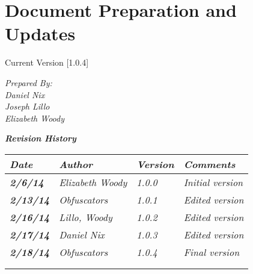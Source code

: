 
\chapter{Document Preparation and Updates}

Current Version [1.0.4]
\vspace*{5mm}

{\color{MSBlue3}
\noindent
\textit{Prepared By:}\\
\textit{Daniel Nix}\\
\textit{Joseph Lillo}\\
\textit{Elizabeth Woody}
}

\vfill
\noindent
{\color{color02} \textit{\textbf{Revision History}}}\\
\begin{tabular}{|>{\raggedright}p{1.5cm}|>{\raggedright}p{3cm}|>{\raggedright}p{1.5cm}|>{\raggedright}p{9cm}|}
\hline
\textit{\textbf{Date}} &  \textit{\textbf{Author}} & \textit{\textbf{Version}} & \textit{\textbf{Comments}}\tabularnewline
\hline
 \textit{\textbf{2/6/14}} & \textit{Elizabeth Woody} & \textit{1.0.0} & \textit{Initial version}\tabularnewline
\hline
\textit{\textbf{2/13/14}} & \textit{Obfuscators} & \textit{1.0.1} & \textit{Edited version}\tabularnewline
\hline
 \textit{\textbf{2/16/14}} & \textit{Lillo, Woody} & \textit{1.0.2} & \textit{Edited version}\tabularnewline
 \hline
 \textit{\textbf{2/17/14}} & \textit{Daniel Nix} & \textit{1.0.3} & \textit{Edited version}\tabularnewline
\hline
 \textit{\textbf{2/18/14}} & \textit{Obfuscators} & \textit{1.0.4} & \textit{Final version}\tabularnewline
\hline
 &  &  & \tabularnewline
\hline
 &  &  & \tabularnewline
\hline
\end{tabular}
\vfill

